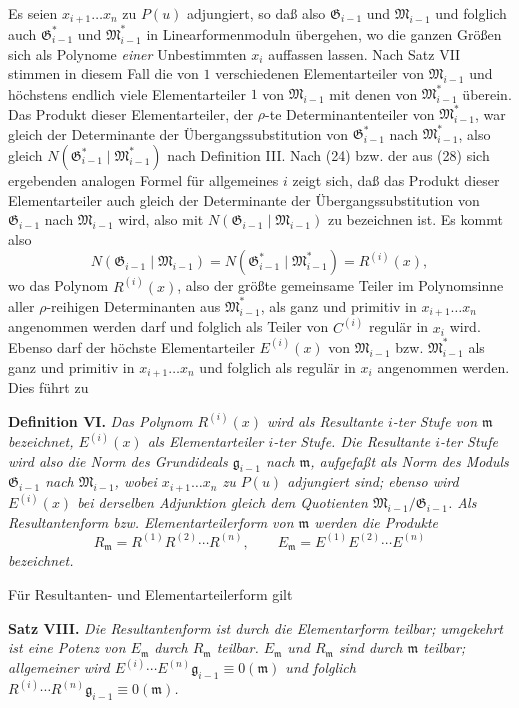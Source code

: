 \documentclass[11pt]{article}
\providecommand{\Gmod}{\mathfrak G}
\providecommand{\Mmod}{\mathfrak M}
\providecommand{\mideal}{\mathfrak m}
\providecommand{\gideal}{\mathfrak g}
\begin{document}
Es seien $x_{i+1}\ldots x_n$ zu $P(u)$ adjungiert, so daß also $\Gmod_{i-1}$ und $\Mmod_{i-1}$ und folglich auch $\Gmod^*_{i-1}$ und $\Mmod^*_{i-1}$ in Linearformenmoduln übergehen, wo die ganzen Größen sich als Polynome \emph{einer} Unbestimmten $x_i$ auffassen lassen. Nach Satz VII stimmen in diesem Fall die von $1$ verschiedenen Elementarteiler von $\Mmod_{i-1}$ und höchstens endlich viele Elementarteiler $1$ von $\Mmod_{i-1}$ mit denen von $\Mmod^*_{i-1}$ überein. Das Produkt dieser Elementarteiler, der $\rho$-te Determinantenteiler von $\Mmod^*_{i-1}$, war gleich der Determinante der Übergangssubstitution von $\Gmod^*_{i-1}$ nach $\Mmod^*_{i-1}$, also gleich $N(\Gmod^*_{i-1}\mid\Mmod^*_{i-1})$ nach Definition III. Nach (24) bzw. der aus (28) sich ergebenden analogen Formel für allgemeines $i$ zeigt sich, daß das Produkt dieser Elementarteiler auch gleich der Determinante der Übergangssubstitution von $\Gmod_{i-1}$ nach $\Mmod_{i-1}$ wird, also mit $N(\Gmod_{i-1}\mid\Mmod_{i-1})$ zu bezeichnen ist. Es kommt also
\[
 N(\Gmod_{i-1}\mid\Mmod_{i-1})=N(\Gmod^*_{i-1}\mid\Mmod^*_{i-1})=R^{(i)}(x),
\]
wo das Polynom $R^{(i)}(x)$, also der größte gemeinsame Teiler im Polynomsinne aller $\rho$-reihigen Determinanten aus $\Mmod^*_{i-1}$, als ganz und primitiv in $x_{i+1}\ldots x_n$ angenommen werden darf und folglich als Teiler von $C^{(i)}$ regulär in $x_i$ wird. Ebenso darf der höchste Elementarteiler $E^{(i)}(x)$ von $\Mmod_{i-1}$ bzw. $\Mmod^*_{i-1}$ als ganz und primitiv in $x_{i+1}\ldots x_n$ und folglich als regulär in $x_i$ angenommen werden. Dies führt zu

\medskip
\noindent\textbf{Definition VI.} \emph{Das Polynom $R^{(i)}(x)$ wird als Resultante $i$-ter Stufe von $\mideal$ bezeichnet, $E^{(i)}(x)$ als Elementarteiler $i$-ter Stufe. Die Resultante $i$-ter Stufe wird also die Norm des Grundideals $\gideal_{i-1}$ nach $\mideal$, aufgefaßt als Norm des Moduls $\Gmod_{i-1}$ nach $\Mmod_{i-1}$, wobei $x_{i+1}\ldots x_n$ zu $P(u)$ adjungiert sind; ebenso wird $E^{(i)}(x)$ bei derselben Adjunktion gleich dem Quotienten $\Mmod_{i-1}/\Gmod_{i-1}$. Als Resultantenform bzw. Elementarteilerform von $\mideal$ werden die Produkte}
\[
 R_\mideal=R^{(1)}R^{(2)}\cdots R^{(n)},\qquad
 E_\mideal=E^{(1)}E^{(2)}\cdots E^{(n)}
\]
\emph{bezeichnet.}

Für Resultanten- und Elementarteilerform gilt

\medskip
\noindent\textbf{Satz VIII.} \emph{Die Resultantenform ist durch die Elementarform teilbar; umgekehrt ist eine Potenz von $E_\mideal$ durch $R_\mideal$ teilbar. $E_\mideal$ und $R_\mideal$ sind durch $\mideal$ teilbar; allgemeiner wird $E^{(i)}\cdots E^{(n)}\gideal_{i-1}\equiv0(\mideal)$ und folglich $R^{(i)}\cdots R^{(n)}\gideal_{i-1}\equiv0(\mideal)$.}
\end{document}
